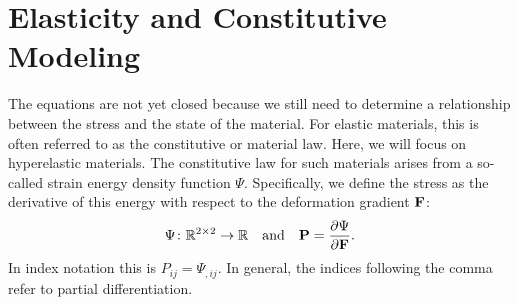\section*{Elasticity and Constitutive Modeling}

The equations are not yet closed because we still need to determine a relationship between the stress and the state of the material. For elastic materials, this is often referred to as the constitutive or material law. Here, we will focus on hyperelastic materials. The constitutive law for such materials arises from a so-called strain energy density function $\Psi$. Specifically, we define the stress as the derivative of this energy with respect to the deformation gradient $\mathbf{F}$:
\begin{equation*}
\Psi \colon \mathbb{R}^{2\times2} \to \mathbb{R} \quad \text{and} \quad \mathbf{P} = \frac{\partial\Psi}{\partial\mathbf{F}}.
\end{equation*}
In index notation this is $P_{ij} = \Psi_{,ij}$. In general, the indices following the comma refer to partial differentiation.

